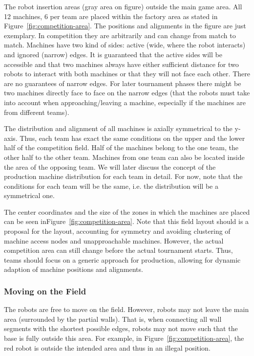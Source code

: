 \documentclass[12pt,twoside]{article}
\newcommand{\reffig}[1]{Figure~\ref{#1}}
\begin{document}
The robot insertion areas (gray area on figure) outside the main game
area. All 12 machines, 6 per team are placed within the factory area
as stated in \reffig{fig:competition-area}.  The positions and
alignments in the figure are just exemplary.  In competition they are
arbitrarily and can change from match to match.  Machines have two
kind of sides: active (wide, where the robot interacts) and ignored
(narrow) edges.  It is guaranteed that the active sides will be
accessible and that two machines always have either sufficient
distance for two robots to interact with both machines or that they
will not face each other. There are no guarantees of narrow edges.
For later tournament phases there might be two machines directly face
to face on the narrow edges (that the robots must take into account
when approaching/leaving a machine, especially if the machines are
from different teams).

The distribution and alignment of all machines is axially symmetrical
to the y-axis. Thus, each team has exact the same conditions on the
upper and the lower half of the competition field. Half of the
machines belong to the one team, the other half to the other
team. Machines from one team can also be located inside the area of
the opposing team. We will later discuss the concept of the production
machine distribution for each team in detail. For now, note that the
conditions for each team will be the same, i.e. the distribution will
be a symmetrical one.

The center coordinates and the size of the zones in which the machines
are placed can be seen in\reffig{fig:competition-area}.  Note that
this field layout should is a proposal for the layout, accounting for
symmetry and avoiding clustering of machine access nodes and
unapproachable machines. However, the actual competition area can
still change before the actual tournament starts. Thus, teams should
focus on a generic approach for production, allowing for dynamic
adaption of machine positions and alignments.

\subsubsection{Moving on the Field}
\label{sec:field-movement}
The robots are free to move on the field. However, robots may not
leave the main area (surrounded by the partial walls). That is, when
connecting all wall segments with the shortest possible edges, robots
may not move such that the base is fully outside this area. For
example, in \reffig{fig:competition-area}, the red robot is outside
the intended area and thus in an illegal position.
\end{document}
